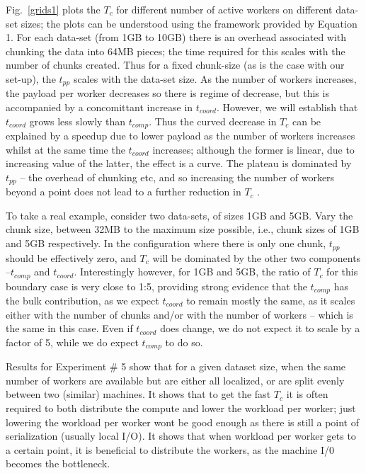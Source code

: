 \documentclass[conference,final]{IEEEtran}
\newcommand{\tc }{ $T_c$ }
\begin{document}
Fig.~\ref{grids1} plots the \tc for different number of active workers
on different data-set sizes; the plots can be understood using the
framework provided by Equation 1. For each data-set (from 1GB to 10GB)
there is an overhead associated with chunking the data into 64MB
pieces; the time required for this scales with the number of chunks
created.  Thus for a fixed chunk-size (as is the case with our
set-up), the $t_{pp}$ scales with the data-set size. As the number of
workers increases, the payload per worker decreases so there is regime
of decrease, but this is accompanied by a concomittant increase in
$t_{coord}$. However, we will establish that $t_{coord}$ grows less
slowly than $t_{comp}$. Thus the curved decrease in \tc can be
explained by a speedup due to lower payload as the number of workers
increases whilst at the same time the $t_{coord}$ increases; although
the former is linear, due to increasing value of the latter, the
effect is a curve. The plateau is dominated by $t_{pp}$ -- the
overhead of chunking etc, and so increasing the number of workers
beyond a point does not lead to a further reduction in \tc.

To take a real example, consider two data-sets, of sizes 1GB and 5GB.
Vary the chunk size, between 32MB to the maximum size possible, i.e.,
chunk sizes of 1GB and 5GB respectively. In the configuration where
there is only one chunk, $t_{pp}$ should be effectively zero, and \tc
will be dominated by the other two components --$t_{comp}$ and
$t_{coord}$.  Interestingly however, for 1GB and 5GB, the ratio of \tc
for this boundary case is very close to 1:5, providing strong evidence
that the $t_{comp}$ has the bulk contribution, as we expect
$t_{coord}$ to remain mostly the same, as it scales either with the number 
of chunks and/or with the number of workers -- which is 
the same in this case.  Even if $t_{coord}$ does change, we do not
expect it to scale by a factor of 5, while we do expect $t_{comp}$ to
do so.



Results for Experiment \# 5 show that for a given dataset size,
when the same number of workers are available but are
either all localized, or are split evenly between two (similar)
machines. It shows that to get the fast \tc it is often required to
both distribute the compute and lower the workload per worker; just
lowering the workload per worker wont be good enough as there is still
a point of serialization (usually local I/O).  It shows that when
workload per worker gets to a certain point, it is beneficial
to distribute the workers, as the machine I/0 becomes the bottleneck.
\end{document}
